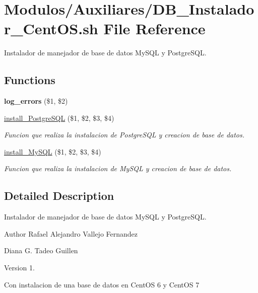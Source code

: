 \hypertarget{DB__Instalador__CentOS_8sh}{}\section{Modulos/\+Auxiliares/\+D\+B\+\_\+\+Instalador\+\_\+\+Cent\+OS.sh File Reference}
\label{DB__Instalador__CentOS_8sh}


Instalador de manejador de base de datos My\+S\+QL y Postgre\+S\+QL.  


\subsection*{Functions}
\begin{DoxyCompactItemize}
\item 
\mbox{\label{DB__Instalador__CentOS_8sh_a92067b58a8478c9841b2cd9b75ea3565}} 
{\bfseries log\+\_\+errors} (\$1, \$2)
\item 
\hyperlink{DB__Instalador__CentOS_8sh_a2beea69eb7cbab84d383356299dfd1aa}{install\+\_\+\+Postgre\+S\+QL} (\$1, \$2, \$3, \$4)
\begin{DoxyCompactList}\small\item\em Funcion que realiza la instalacion de Postgre\+S\+QL y creacion de base de datos. \end{DoxyCompactList}\item 
\hyperlink{DB__Instalador__CentOS_8sh_ad5fcd4a31738d363887eefeb4d743a56}{install\+\_\+\+My\+S\+QL} (\$1, \$2, \$3, \$4)
\begin{DoxyCompactList}\small\item\em Funcion que realiza la instalacion de My\+S\+QL y creacion de base de datos. \end{DoxyCompactList}\end{DoxyCompactItemize}


\subsection{Detailed Description}
Instalador de manejador de base de datos My\+S\+QL y Postgre\+S\+QL. 

\begin{DoxyAuthor}{Author}
Rafael Alejandro Vallejo Fernandez 

Diana G. Tadeo Guillen 
\end{DoxyAuthor}
\begin{DoxyVersion}{Version}
1.
\end{DoxyVersion}
Con instalacion de una base de datos en Cent\+OS 6 y Cent\+OS 7 


